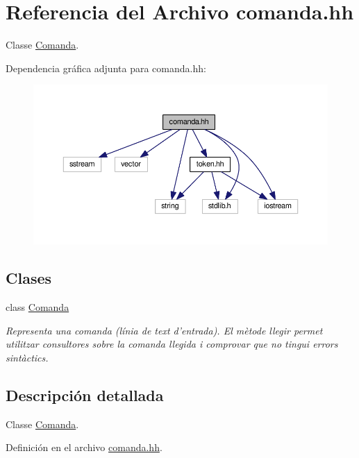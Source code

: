 \hypertarget{comanda_8hh}{\section{Referencia del Archivo comanda.\-hh}
\label{comanda_8hh}
}


Classe \hyperlink{class_comanda}{Comanda}.  


Dependencia gráfica adjunta para comanda.\-hh\-:\nopagebreak
\begin{figure}[H]
\begin{center}
\leavevmode
\includegraphics[width=350pt]{comanda_8hh__incl}
\end{center}
\end{figure}
\subsection*{Clases}
\begin{DoxyCompactItemize}
\item 
class \hyperlink{class_comanda}{Comanda}
\begin{DoxyCompactList}\small\item\em Representa una comanda (línia de text d'entrada). El mètode llegir permet utilitzar consultores sobre la comanda llegida i comprovar que no tingui errors sintàctics. \end{DoxyCompactList}\end{DoxyCompactItemize}


\subsection{Descripción detallada}
Classe \hyperlink{class_comanda}{Comanda}. 

Definición en el archivo \hyperlink{comanda_8hh_source}{comanda.\-hh}.


